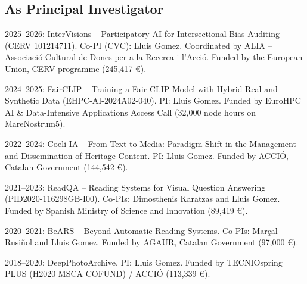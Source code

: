 \documentclass[11pt]{article}
\newenvironment{entries}{%
  \begin{list}{}{\setlength{\leftmargin}{3em}\setlength{\itemindent}{-1.5em}%
    \setlength{\itemsep}{0.35em}\setlength{\parsep}{0pt}\setlength{\topsep}{0.2em}}}%
  {\end{list}}
\begin{document}
\subsection*{As Principal Investigator}
\begin{entries}
\item 2025--2026: InterVisions -- Participatory AI for Intersectional Bias Auditing (CERV 101214711). Co-PI (CVC): Lluis Gomez. Coordinated by ALIA -- Associació Cultural de Dones per a la Recerca i l'Acció. Funded by the European Union, CERV programme (245,417 €).
\item 2024--2025: FairCLIP -- Training a Fair CLIP Model with Hybrid Real and Synthetic Data (EHPC-AI-2024A02-040). PI: Lluis Gomez. Funded by EuroHPC AI \& Data-Intensive Applications Access Call (32,000 node hours on MareNostrum5).
\item 2022--2024: Coeli-IA -- From Text to Media: Paradigm Shift in the Management and Dissemination of Heritage Content. PI: Lluis Gomez. Funded by ACCIÓ, Catalan Government (144,542 €).
\item 2021--2023: ReadQA -- Reading Systems for Visual Question Answering (PID2020-116298GB-I00). Co-PIs: Dimosthenis Karatzas and Lluis Gomez. Funded by Spanish Ministry of Science and Innovation (89,419 €).
\item 2020--2021: BeARS -- Beyond Automatic Reading Systems. Co-PIs: Marçal Rusiñol and Lluis Gomez. Funded by AGAUR, Catalan Government (97,000 €).
\item 2018--2020: DeepPhotoArchive. PI: Lluis Gomez. Funded by TECNIOspring PLUS (H2020 MSCA COFUND) / ACCIÓ (113,339 €).
\end{entries}
\end{document}

